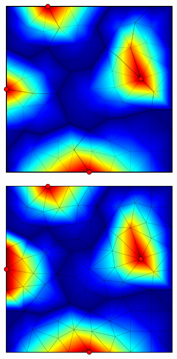 \begin{figure}[htbp]
  \begin{subfigure}[t]{0.3\textwidth}
    \centerline{\includegraphics[width=0.9\linewidth]{figs/square/square_tria_metis_node_conv}}
  \end{subfigure}
  \hfill
  \begin{subfigure}[t]{0.3\textwidth}
    \centerline{\includegraphics[width=0.9\linewidth]{figs/square/square_tria_metis_node_conv_bc_nonsymm}}

\end{subfigure}
\end{figure}
